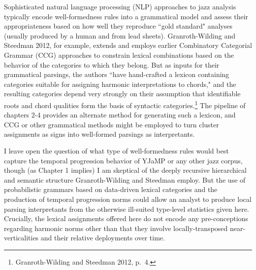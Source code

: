 \begin{enumerate}
Sophisticated natural language processing (NLP) approaches to jazz analysis typically encode well-formedness rules into a grammatical model and assess their appropriateness based on how well they reproduce ``gold standard" analyses (usually produced by a human and from lead sheets).  Granroth-Wilding and Steedman 2012, for example, extends and employs earlier Combinatory Categorial Grammar (CCG) approaches to constrain lexical combinations based on the behavior of the categories to which they belong.  But as inputs for their grammatical parsings, the authors ``have hand-crafted a lexicon containing categories suitable for assigning harmonic interpretations to chords," and the resulting categories depend very strongly on their assumption that identifiable roots and chord qualities form the basis of syntactic categories.\footnote{Granroth-Wilding and Steedman 2012, p.\ 4.}  The pipeline of chapters 2-4 provides an alternate method for generating such a lexicon, and CCG or other grammatical methods might be employed to turn cluster assignments as signs into well-formed parsings as interpretants.

I leave open the question of what type of well-formedness rules would best capture the temporal progression behavior of YJaMP or any other jazz corpus, though (as Chapter 1 implies) I am skeptical of the deeply recursive hierarchical and semantic structure Granroth-Wilding and Steedman employ.  But the use of probabilistic grammars based on data-driven lexical categories and the production of temporal progression norms could allow an analyst to produce local parsing interpretants from the otherwise ill-suited type-level statistics given here.  Crucially, the lexical assignments offered here do not encode any pre-conceptions regarding harmonic norms other than that they involve locally-transposed near-verticalities and their relative deployments over time.%


\end{enumerate}
